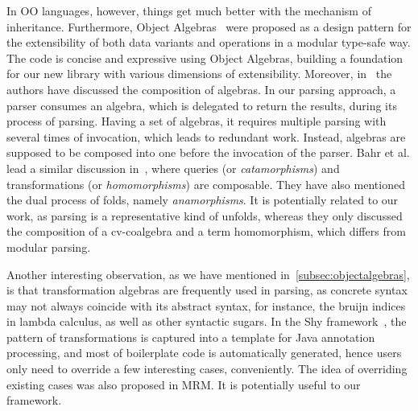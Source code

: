 In OO languages, however, things get much better with the mechanism of
inheritance. Furthermore, Object Algebras~\cite{Oliveira2012} were
proposed as a design pattern for the extensibility of both data
variants and operations in a modular type-safe way. The code is
concise and expressive using Object Algebras, building a foundation
for our new library with various dimensions of extensibility.
Moreover, in~\cite{Oliveira2012} the authors have discussed the
composition of algebras. In our parsing approach, a parser consumes an
algebra, which is delegated to return the results, during its process
of parsing. Having a set of algebras, it requires multiple parsing
with several times of invocation, which leads to redundant work.
Instead, algebras are supposed to be composed into one before the
invocation of the parser. Bahr et al. lead a similar discussion
in~\cite{Bahr2011}, where queries (or \textit{catamorphisms}) and
transformations (or \textit{homomorphisms}) are composable. They have
also mentioned the dual process of folds, namely
\textit{anamorphisms}. It is potentially related to our work, as
parsing is a representative kind of unfolds, whereas they only
discussed the composition of a cv-coalgebra and a term homomorphism,
which differs from modular parsing. 

Another interesting observation, as we have mentioned
in~\ref{subsec:objectalgebras}, is that transformation algebras are
frequently used in parsing, as concrete syntax may not always coincide
with its abstract syntax, for instance, the bruijn indices in lambda
calculus, as well as other syntactic sugars. In the Shy
framework~\cite{Zhang2015}, the pattern of transformations is captured
into a template for Java annotation processing, and most of
boilerplate code is automatically generated, hence users only need to
override a few interesting cases, conveniently. The idea of overriding
existing cases was also proposed in MRM. It is potentially useful to
our framework.
